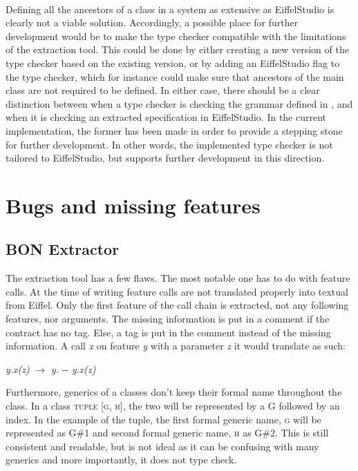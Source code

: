 \paragraph{}
Defining all the ancestors of a class in a system as extensive as EiffelStudio is clearly not a viable solution. Accordingly, a possible place for further development would be to make the type checker compatible with the limitations of the extraction tool. This could be done by either creating a new version of the type checker based on the existing version, or by adding an EiffelStudio flag to the type checker, which for instance could make sure that ancestors of the main class are not required to be defined. In either case, there should be a clear distinction between when a type checker is checking the grammar defined in \cite{walden1995}, and when it is checking an extracted specification in EiffelStudio. In the current implementation, the former has been made in order to provide a stepping stone for further development. In other words, the implemented type checker is not tailored to EiffelStudio, but supports further development in this direction.

\section{Bugs and missing features}
\subsection{BON Extractor}
\label{bugs_bon_extractors}
The \bon{} extraction tool has a few flaws. The most notable one has to do with feature calls. At the time of writing feature calls are not translated properly into textual \bon{} from Eiffel. Only the first feature of the call chain is extracted, not any following features, nor arguments. The missing information is put in a comment if the contract has no tag. Else, a tag is put in the comment instead of the missing information. A call \textit{x} on feature \textit{y} with a parameter \textit{z} it would translate as such:
\begin{center}
\textit{y.x(z)} $\rightarrow$ \textit{y.} -\-- \textit{y.x(z)}
\end{center}

Furthermore, generics of a classes don't keep their formal name throughout the class. In a class \textsc{tuple [g, h]}, the two will be represented by a G followed by an index. In the example of the tuple, the first formal generic name, \textsc{g} will be represented as G\#1 and second formal generic name, \textsc{h} as G\#2. This is still consistent and readable, but is not ideal as it can be confusing with many generics and more importantly, it does not type check.

